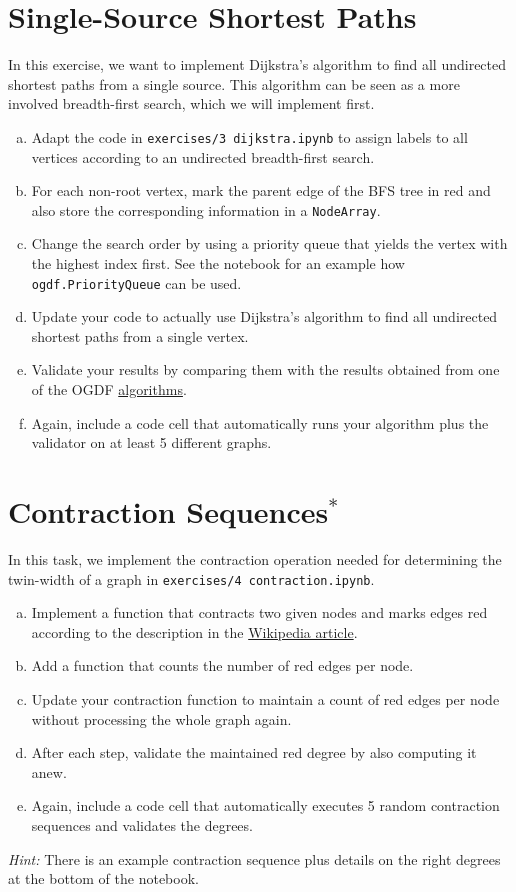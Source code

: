 \documentclass{article}
\begin{document}
\section{Single-Source Shortest Paths}
In this exercise, we want to implement Dijkstra's algorithm to find all undirected shortest paths from a single source.
This algorithm can be seen as a more involved breadth-first search, which we will implement first.
\begin{enumerate}[a)]
\item Adapt the code in \texttt{exercises/3 dijkstra.ipynb} to assign labels to all vertices according to an undirected breadth-first search.
\item For each non-root vertex, mark the parent edge of the BFS tree in red and also store the corresponding information in a \texttt{NodeArray}.
\item Change the search order by using a priority queue that yields the vertex with the highest index first. See the notebook for an example how \texttt{ogdf.PriorityQueue} can be used.
\item Update your code to actually use Dijkstra's algorithm to find all undirected shortest paths from a single vertex.
\item Validate your results by comparing them with the results obtained from one of the OGDF \href{https://ogdf.github.io/doc/ogdf/group__ga-sp.html}{algorithms}.
\item Again, include a code cell that automatically runs your algorithm plus the validator on at least 5 different graphs.
\end{enumerate}

\section{Contraction Sequences$^\ast$}
In this task, we implement the contraction operation needed for determining the twin-width of a graph in \texttt{exercises/4 contraction.ipynb}.
\begin{enumerate}[a)]
\item Implement a function that contracts two given nodes and marks edges red according to the description in the \href{https://en.wikipedia.org/wiki/Twin-width}{Wikipedia article}.
\item Add a function that counts the number of red edges per node.
\item Update your contraction function to maintain a count of red edges per node without processing the whole graph again.
\item After each step, validate the maintained red degree by also computing it anew.
\item Again, include a code cell that automatically executes 5 random contraction sequences and validates the degrees.
\end{enumerate}
\emph{Hint:} There is an example contraction sequence plus details on the right degrees at the bottom of the notebook.
\end{document}
